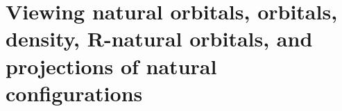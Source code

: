 \documentclass[10pt,leqno, oneside]{book}
\begin{document}


\section{Viewing natural orbitals, orbitals, density, R-natural orbitals, and projections of natural configurations \label{viewsect}}
\end{document}
